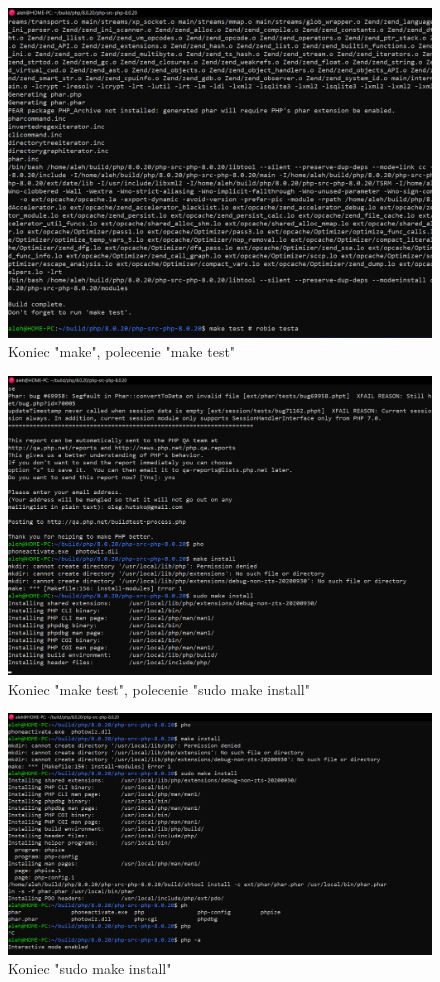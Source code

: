 \documentclass[a4paper,12pt,oneside]{report} %
\begin{document}
\begin{figure}[h]
    \includegraphics[width=16cm]{e10.png}
	\caption{Koniec "make", polecenie "make test"}
    \label{fig:fifth}
\end{figure}

\begin{figure}[h]
    \includegraphics[width=16cm]{e11.png}
	\caption{Koniec "make test", polecenie "sudo make install"}
    \label{fig:sixth}
\end{figure}

\begin{figure}[h]
    \includegraphics[width=16cm]{e12.png}
	\caption{Koniec "sudo make install"}
    \label{fig:seventh}
\end{figure}
\end{document}
